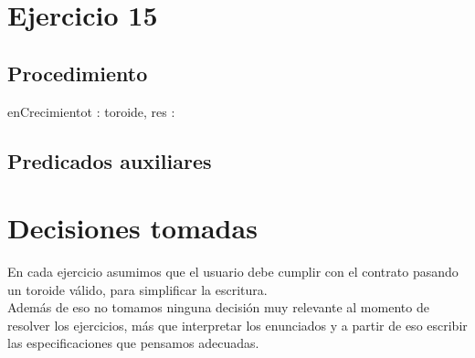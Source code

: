 \documentclass[a4paper]{article}
\begin{document}

\section{Ejercicio 15}

\subsection{Procedimiento}
\begin{proc}{enCrecimiento}{\In t : toroide, \Out res : \bool}{}
\end{proc}

\subsection{Predicados auxiliares}

\section{Decisiones tomadas}
En cada ejercicio asumimos que el usuario debe cumplir con el contrato pasando un toroide válido, para simplificar la escritura.\\ 
\indent Además de eso no tomamos ninguna decisión muy relevante al momento de resolver los ejercicios, más que interpretar los enunciados y a partir de eso escribir las especificaciones que pensamos adecuadas.
\end{document}
